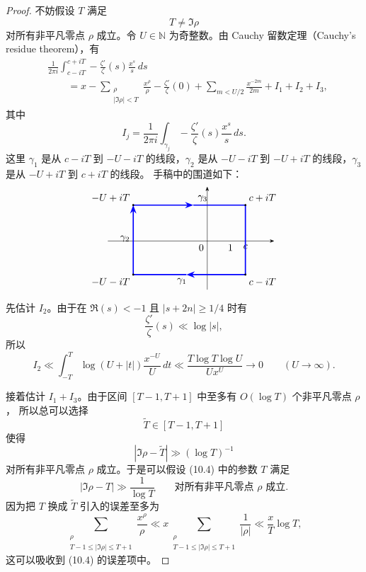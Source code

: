 \begin{proof}
	不妨假设 $T$ 满足
	\[
		T\neq \Im\rho
	\]
	对所有非平凡零点 $\rho$ 成立。令 $U\in\mathbb N$ 为奇整数。由 Cauchy 留数定理（Cauchy's residue theorem），有
	\begin{equation}
	\begin{aligned}
		&
		\frac1{2\pi i}
		\int_{c-iT}^{c+iT}
		-\frac{\zeta'}{\zeta}(s)\frac{x^s}{s}\,ds \\
		&\qquad=
		x
		-
		\sum_{\substack{\rho\\ |\Im\rho|<T}}\frac{x^\rho}{\rho}
		-
		\frac{\zeta'}{\zeta}(0)
		+
		\sum_{m<U/2}\frac{x^{-2m}}{2m}
		+
		I_1+I_2+I_3,
	\end{aligned}
		\tag{10.7}
	\end{equation}
	其中
	\[
		I_j
		=
		\frac1{2\pi i}
		\int_{\gamma_j}
		-\frac{\zeta'}{\zeta}(s)\frac{x^s}{s}\,ds.
	\]
	这里 $\gamma_1$ 是从 $c-iT$ 到 $-U-iT$ 的线段，$\gamma_2$ 是从
	$-U-iT$ 到 $-U+iT$ 的线段，$\gamma_3$ 是从 $-U+iT$ 到 $c+iT$ 的线段。
	手稿中的围道如下：
	\[
	\begin{tikzpicture}[baseline=(current bounding box.center),scale=0.82,>=Stealth]
		\draw[->] (-4.3,0) -- (2.9,0);
		\draw[->] (0,-2.1) -- (0,2.35);
		\node[below left] at (0,0) {$0$};
		\node[below] at (1,0) {$1$};
		\node[below] at (1.65,0) {$c$};
		\coordinate (A) at (1.65,-1.45);
		\coordinate (B) at (-3.2,-1.45);
		\coordinate (C) at (-3.2,1.55);
		\coordinate (D) at (1.65,1.55);
		\draw[blue,very thick,->] (A) -- (-0.9,-1.45);
		\draw[blue,very thick] (-0.9,-1.45) -- (B);
		\node[below] at (-1.1,-1.45) {$\gamma_1$};
		\draw[blue,very thick,->] (B) -- (C);
		\node[left] at (-3.2,0.1) {$\gamma_2$};
		\draw[blue,very thick,->] (C) -- (-0.6,1.55);
		\draw[blue,very thick] (-0.6,1.55) -- (D);
		\node[above] at (-0.2,1.55) {$\gamma_3$};
		\draw[blue,very thick] (D) -- (A);
		\fill (A) circle (1.2pt) node[below right] {$c-iT$};
		\fill (D) circle (1.2pt) node[above right] {$c+iT$};
		\fill (B) circle (1.2pt) node[below left] {$-U-iT$};
		\fill (C) circle (1.2pt) node[above left] {$-U+iT$};
	\end{tikzpicture}
	\]

	先估计 $I_2$。由于在 $\Re(s)<-1$ 且 $|s+2n|\geq 1/4$ 时有
	\[
		\frac{\zeta'}{\zeta}(s)\ll \log|s|,
	\]
	所以
	\[
		I_2
		\ll
		\int_{-T}^{T}
		\log(U+|t|)\frac{x^{-U}}{U}\,dt
		\ll
		\frac{T\log T\log U}{Ux^U}
		\longrightarrow 0
		\qquad (U\to\infty).
	\]

	接着估计 $I_1+I_3$。由于区间 $[T-1,T+1]$ 中至多有 $O(\log T)$ 个非平凡零点 $\rho$，
	所以总可以选择
	\[
		\widetilde T\in[T-1,T+1]
	\]
	使得
	\[
		|\Im\rho-\widetilde T|\gg (\log T)^{-1}
	\]
	对所有非平凡零点 $\rho$ 成立。于是可以假设 (10.4) 中的参数 $T$ 满足
	\begin{equation}
		|\Im\rho-T|\gg \frac1{\log T}
		\qquad
		\text{对所有非平凡零点 }\rho\text{ 成立}.
		\tag{10.8}
	\end{equation}
	因为把 $T$ 换成 $\widetilde T$ 引入的误差至多为
	\[
		\sum_{\substack{\rho\\ T-1\leq|\Im\rho|\leq T+1}}
		\frac{x^\rho}{\rho}
		\ll
		x
		\sum_{\substack{\rho\\ T-1\leq|\Im\rho|\leq T+1}}
		\frac1{|\rho|}
		\ll
		\frac{x}{T}\log T,
	\]
	这可以吸收到 (10.4) 的误差项中。


\end{proof}
